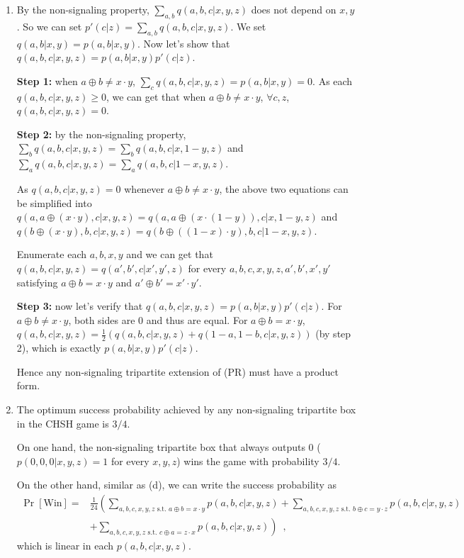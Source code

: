 \documentclass[12pt]{article}
\begin{document}
\begin{enumerate}
\begin{enumerate}
\item By the non-signaling property, $\sum_{a, b} q(a, b, c | x, y, z)$ does not depend on $x, y$. So we can set $p'(c|z) = \sum_{a, b} q(a, b, c | x, y, z)$. We set $q(a, b | x, y) = p(a, b | x, y)$. Now let's show that $q(a, b, c|x, y, z) = p(a, b| x, y) p'(c|z)$.

\textbf{Step 1:} when $a \oplus b \ne x \cdot y$, $\sum_c q(a, b, c|x, y, z) = p(a, b | x, y) = 0$. As each $q(a, b, c|x, y, z) \ge 0$, we can get that when $a \oplus b \ne x \cdot y$, $\forall c, z$, $q(a, b, c|x, y, z) = 0$.

\textbf{Step 2:} by the non-signaling property, $\sum_{b} q(a, b, c | x, y, z) = \sum_{b} q(a, b, c | x, 1 - y, z)$ and $\sum_{a} q(a, b, c | x, y, z) = \sum_{a} q(a, b, c | 1- x, y, z)$. 

As $q(a, b, c|x, y, z) = 0$ whenever $a \oplus b \ne x \cdot y$, the above two equations can be simplified into $q(a, a \oplus (x \cdot y), c | x, y, z) = q(a, a \oplus (x \cdot (1 - y)), c | x, 1 - y, z)$ and $q(b \oplus (x \cdot y), b, c | x, y, z) = q(b \oplus ((1 - x) \cdot y), b, c | 1- x, y, z)$.

Enumerate each $a, b, x, y$ and we can get that $q(a, b, c | x, y, z) = q(a', b', c | x', y', z)$ for every $a, b, c, x, y, z, a', b', x', y'$ satisfying $a \oplus b = x \cdot y$ and $a' \oplus b' = x' \cdot y'$.

\textbf{Step 3:} now let's verify that $q(a, b, c|x, y, z) = p(a, b| x, y) p'(c|z)$. For $a \oplus b \ne x \cdot y$, both sides are 0 and thus are equal. For $a \oplus b = x \cdot y$, $q(a, b, c|x, y, z) = \frac{1}{2}(q(a, b, c|x, y, z) + q(1 - a, 1 - b, c|x, y, z))$ (by step 2), which is exactly $p(a, b| x, y) p'(c|z)$.

Hence any non-signaling tripartite extension of (PR) must have a product form.

\item The optimum success probability achieved by any non-signaling tripartite box in the CHSH game is $3/4$. 

On one hand, the non-signaling tripartite box that always outputs 0 ($p(0, 0, 0 | x, y, z) = 1$ for every $x, y, z$) wins the game with probability $3/4$. 

On the other hand, similar as (d), we can write the success probability as
\begin{align*}
	\Pr\left[\text{Win}\right] =& \frac{1}{24}\left(\sum_{a, b, c, x, y, z \text{ s.t. }a \oplus b = x \cdot y}p(a, b, c| x, y, z) + \sum_{a, b, c, x, y, z \text{ s.t. }b \oplus c = y \cdot z}p(a, b, c| x, y, z)\right.\\
	 &\left.+ \sum_{a, b, c, x, y, z \text{ s.t. }c \oplus a = z \cdot x}p(a, b, c| x, y, z)\right)\enspace,
\end{align*}
which is linear in each $p(a, b, c| x, y, z)$.


\end{enumerate}
\end{enumerate}
\end{document}
